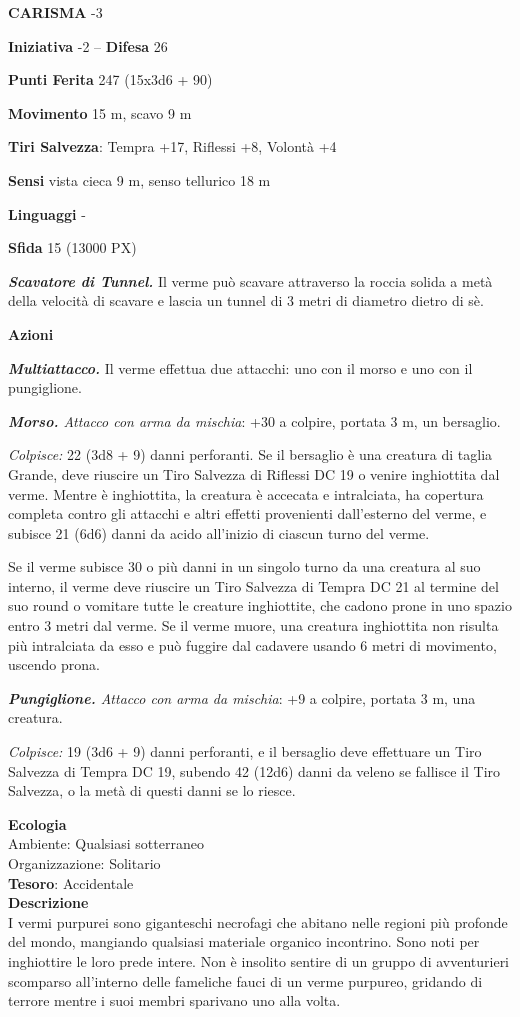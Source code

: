 \begin{multicols}{2}
\textbf{CARISMA} -3

\textbf{Iniziativa} -2 -- \textbf{Difesa} 26

\textbf{Punti Ferita} 247 (15x3d6 + 90)

\textbf{Movimento} 15 m, scavo 9 m

\textbf{Tiri Salvezza}: Tempra +17, Riflessi +8, Volontà +4

\textbf{Sensi} vista cieca 9 m, senso tellurico 18 m

\textbf{Linguaggi} -

\textbf{Sfida} 15 (13000 PX)

\textit{\textbf{Scavatore di Tunnel.}} Il verme può scavare attraverso la roccia solida a metà della velocità di scavare e lascia un tunnel di 3 metri di diametro dietro di sè.

\textbf{Azioni}

\textit{\textbf{Multiattacco.}} Il verme effettua due attacchi: uno con il morso e uno con il pungiglione.

\textit{\textbf{Morso.} Attacco con arma da mischia}: +30 a colpire, portata 3 m, un bersaglio.

\textit{Colpisce:} 22 (3d8 + 9) danni perforanti. Se il bersaglio è una creatura di taglia Grande, deve riuscire un Tiro Salvezza di Riflessi DC 19 o venire inghiottita dal verme. Mentre è inghiottita, la creatura è accecata e intralciata, ha copertura completa contro gli attacchi e altri effetti provenienti dall'esterno del verme, e subisce 21 (6d6) danni da acido all'inizio di ciascun turno del verme.

Se il verme subisce 30 o più danni in un singolo turno da una creatura al suo interno, il verme deve riuscire un Tiro Salvezza di Tempra DC 21 al termine del suo round o vomitare tutte le creature inghiottite, che cadono prone in uno spazio entro 3 metri dal verme. Se il verme muore, una creatura inghiottita non risulta più intralciata da esso e può fuggire dal cadavere usando 6 metri di movimento, uscendo prona.

\textit{\textbf{Pungiglione.} Attacco con arma da mischia}: +9 a colpire, portata 3 m, una creatura.

\textit{Colpisce:} 19 (3d6 + 9) danni perforanti, e il bersaglio deve effettuare un Tiro Salvezza di Tempra DC 19, subendo 42 (12d6) danni da veleno se fallisce il Tiro Salvezza, o la metà di questi danni se lo riesce.

\textbf{Ecologia}\\
Ambiente: Qualsiasi sotterraneo\\
Organizzazione: Solitario\\
\textbf{Tesoro}: Accidentale\\
\textbf{Descrizione}\\
I vermi purpurei sono giganteschi necrofagi che abitano nelle regioni più profonde del mondo, mangiando qualsiasi materiale organico incontrino. Sono noti per inghiottire le loro prede intere. Non è insolito sentire di un gruppo di avventurieri scomparso all'interno delle fameliche fauci di un verme purpureo, gridando di terrore mentre i suoi membri sparivano uno alla volta.


\end{multicols}
